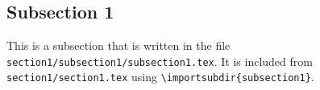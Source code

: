\subsection{Subsection 1}

This is a subsection that is written in the file
\texttt{section1/subsection1/subsection1.tex}.
It is included from \texttt{section1/section1.tex} using
\texttt{\textbackslash importsubdir\{subsection1\}}.
